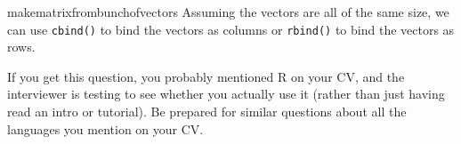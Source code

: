 \begin{answer}{makematrixfrombunchofvectors}
Assuming the vectors are all of the same size, we can use
\verb+cbind()+ to bind the vectors as columns
or
\verb+rbind()+
to bind the vectors as rows.

If you get this question, you probably mentioned R \citep{RCoreTeam} on your CV, and the interviewer is testing to see whether you actually use it (rather than just having read an intro or tutorial).
Be prepared for similar questions about all the languages you mention on your CV.
\end{answer}

